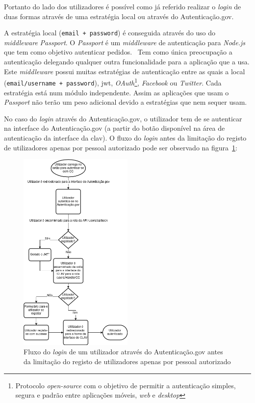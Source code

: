 Portanto do lado dos utilizadores é possível como já referido realizar o \textit{login} de duas formas através de 
uma estratégia local ou através do Autenticação.gov.

A estratégia local (\texttt{email + password}) é conseguida através do uso do \textit{middleware} \textit{Passport}.
O \textit{Passport} é um \textit{middleware} de autenticação para \textit{Node.js} que tem como objetivo autenticar 
pedidos.~\cite{passport} Tem como única preocupação a autenticação delegando qualquer outra funcionalidade para a 
aplicação que a usa. Este \textit{middleware} possui muitas estratégias de autenticação entre as quais a 
local (\texttt{email/username + password}), \acrshort{jwt}, \textit{OAuth}\footnote{Protocolo \textit{open-source} 
com o objetivo de permitir a autenticação simples, segura e padrão entre aplicações móveis, \textit{web} e 
\textit{desktop}}, \textit{Facebook} ou \textit{Twitter}. Cada estratégia está num módulo independente. 
Assim as aplicações que usam o \textit{Passport} não terão um peso adicional devido a estratégias que nem sequer usam.

No caso do \textit{login} através do Autenticação.gov, o utilizador tem de se autenticar na interface do 
Autenticação.gov (a partir do botão disponível na área de autenticação da interface da \acrshort{clav}). 
O fluxo do \textit{login} antes da limitação do registo de utilizadores apenas por pessoal autorizado pode ser observado na figura~\ref{fig:authgov}:

\begin{figure}[H]
    \centering
    \includegraphics[width=0.5\textwidth]{img/authgov.png}
    \caption{Fluxo do \textit{login} de um utilizador através do Autenticação.gov antes da limitação do registo de utilizadores apenas por pessoal autorizado}\label{fig:authgov}
\end{figure}

